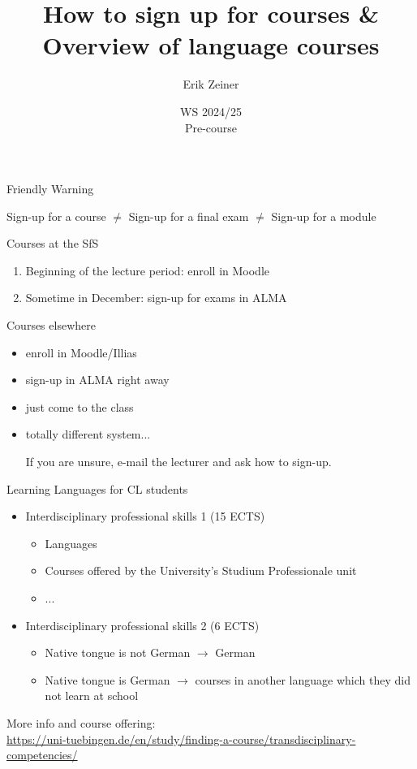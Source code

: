 \documentclass[aspectratio=169,hyperref={unicode}]{beamer}
\title{How to sign up for courses \& Overview of language courses}
\author{Erik Zeiner}
\institute{Fachschaft General \& Computational Linguistics\\ \textbf{University of Tübingen}}
\date{WS 2024/25 \\ Pre-course}
\begin{document}
\frame{\titlepage}

\begin{frame}{Friendly Warning}

Sign-up for a course $\neq$ Sign-up for a final exam $\neq$ Sign-up for a module
\end{frame}


\begin{frame}{Courses at the SfS}
\begin{enumerate}
	\item Beginning of the lecture period: enroll in Moodle
	\item Sometime in December: sign-up for exams in ALMA  
\end{enumerate}
\end{frame}

\begin{frame}{Courses elsewhere}

\begin{itemize}
	\item enroll in Moodle/Illias
	\item sign-up in ALMA right away
	\item just come to the class
	\item totally different system...

\vfill

\begin{center}
	If you are unsure, e-mail the lecturer and ask how to sign-up.
\end{center}
\end{itemize}

\end{frame}

\begin{frame}{Learning Languages for CL students}

\begin{itemize}
	\item Interdisciplinary professional skills 1 (15 ECTS)
	\begin{itemize}
		\item Languages
		\item Courses offered by the University’s Studium Professionale unit
		\item ...
	\end{itemize}
	\item Interdisciplinary professional skills 2 (6 ECTS)
	\begin{itemize}
		\item Native tongue is not German $\rightarrow$ German
		\item Native tongue is
German $\rightarrow$ courses in another language which they did not learn at school
	\end{itemize}
\end{itemize}

\begin{center}
	More info and course offering: \\\url{https://uni-tuebingen.de/en/study/finding-a-course/transdisciplinary-competencies/}
\end{center}
	
\end{frame}
\end{document}
